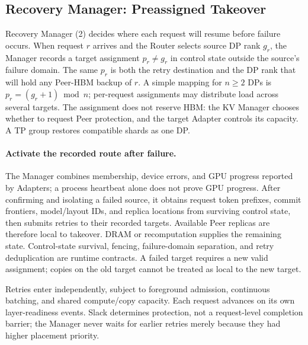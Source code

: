 \subsection{Recovery Manager: Preassigned Takeover}
\label{sec:parallel-recovery}
\label{sec:recovery-manager}

Recovery Manager (2) decides where each request will resume before
failure occurs. When request $r$ arrives and the Router selects source
DP rank $g_r$, the Manager records a target assignment $p_r\ne g_r$
in control state outside the source's failure domain. The same $p_r$
is both the retry destination and the DP rank that will hold any
Peer-HBM backup of $r$. A simple mapping for $n\ge2$ DPs is
$p_r=(g_r+1)\bmod n$; per-request assignments may distribute load across
several targets. The assignment does not reserve HBM: the KV Manager
chooses whether to request Peer protection, and the target Adapter
controls its capacity. A TP group restores compatible shards as one DP.

\paragraph{Activate the recorded route after failure.}
The Manager combines membership, device errors, and GPU progress
reported by Adapters; a process heartbeat alone does not prove GPU
progress. After confirming and isolating a failed source, it obtains
request token prefixes, commit frontiers, model/layout IDs, and replica
locations from surviving control state, then submits retries to their
recorded targets. Available Peer replicas are therefore local to takeover.
DRAM or recomputation supplies the remaining state. Control-state
survival, fencing, failure-domain separation, and retry deduplication
are runtime contracts. A failed target requires a new valid assignment;
copies on the old target cannot be treated as local to the new target.

Retries enter independently, subject to foreground admission, continuous
batching, and shared compute/copy capacity. Each request advances on its
own layer-readiness events. Slack determines protection, not a request-level
completion barrier; the Manager never waits for earlier retries merely
because they had higher placement priority.
